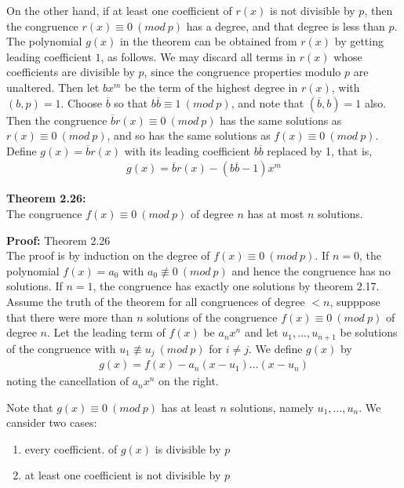 \documentclass[a4paper]{article}
\begin{document}
On the other hand, if at least one coefficient of $r(x)$ is not divisible by
$p$, then the congruence $r(x)\equiv 0\ (mod\ p)$ has a degree, and that degree
is  less than $p$. The polynomial $g(x)$ in the theorem can be obtained from
$r(x)$ by getting leading coefficient $1$, as follows. We may discard all terms
in $r(x)$ whose coefficients are divisible by $p$, since the congruence
properties modulo $p$ are unaltered. Then let $bx^m$ be the term of the highest
degree in $r(x)$, with $(b,p)=1$. Choose $\overline{b}$ so that
$b\overline{b}\equiv 1\ (mod\ p)$, and note that $(\overline{b},b)=1$ also. Then
the congruence $\overline{b}r(x)\equiv 0\ (mod\ p)$ has the same solutions as
$r(x)\equiv 0\ (mod\ p)$, and so has the same solutions as $f(x)\equiv 0\ (mod\ p)$.
Define $g(x)=\overline{b}r(x)$ with its leading coefficient $b\overline{b}$
replaced by 1, that is,
\begin{align}
    g(x)=\overline{b}r(x)-(b\overline{b}-1)x^m
\end{align}

\textbf{Theorem 2.26:}\\
The congruence $f(x)\equiv 0\ (mod\ p)$ of degree $n$ has at most $n$ solutions.

\textbf{Proof:} Theorem 2.26\\
The proof is by induction on the degree of $f(x)\equiv 0\ (mod\ p)$.
If $n=0$, the polynomial $f(x)=a_0$ with $a_0\not\equiv 0\ (mod\ p)$ and hence
the congruence has no solutions. If $n=1$, the congruence has exactly one
solutions by theorem 2.17.
Assume the truth of the theorem for all congruences of degree $<n$, supppose that
there were more than $n$ solutions of the congruence $f(x)\equiv 0\ (mod\ p)$ of
degree $n$. Let the leading term of $f(x)$ be $a_nx^n$ and let $u_1,...,u_{n+1}$
be solutions of the congruence with $u_1\not\equiv u_j\ (mod\ p)$ for $i\neq j$.
We define $g(x)$ by
\begin{align}
    g(x)=f(x)-a_n(x-u_1)...(x-u_n)
\end{align}
noting the cancellation of $a_nx^n$ on the right.

Note that $g(x)\equiv 0\ (mod\ p)$ has at least $n$ solutions, namely $u_1,...,u_n$.
We cansider two cases:
\begin{enumerate}
    \item every coefficient. of $g(x)$ is divisible by $p$
    \item at least one coefficient is not divisible by $p$
\end{enumerate}
\end{document}
